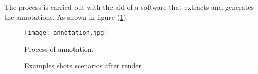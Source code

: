 The process is carried out with the aid of a software that extracts and
generates the annotations. As shown in figure (\ref{fig:annotation}).
\begin{figure}[htb]
	\centering
	\texttt{[image: annotation.jpg]}
	\caption{Process of annotation.}
	\label{fig:annotation}
\end{figure}
%
\begin{figure}[htb]
    \centering
     \quad
     \quad
    \caption{Examples shots scenarios after render}
    \label{fig:renders}
\end{figure}
%
%
